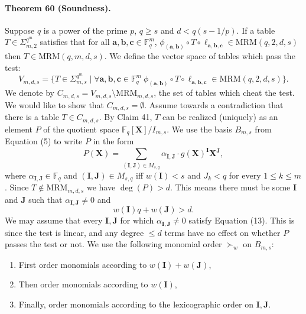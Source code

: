 \paragraph{Theorem 60 (Soundness).} Suppose $q$ is a power of the prime $p$, $q\geq s$ and $d<q(s-1/p)$. If a table $T\in\Sigma_{m,2}^{q^m}$ satisfies that for all $\boldsymbol a,\boldsymbol b,\boldsymbol c\in\mathbb F_q^m$, $\phi_{(\boldsymbol a,\boldsymbol b)}\circ T\circ\ell_{\boldsymbol a,\boldsymbol b,\boldsymbol c}\in\mathrm{MRM}(q,2,d,s)$ then $T\in\mathrm{MRM}(q,m,d,s)$.
We define the vector space of tables which pass the test:
\[V_{m,d,s}=\{T\in\Sigma_{m,s}^{q^m}\mid\forall\boldsymbol a,\boldsymbol b,\boldsymbol c\in\mathbb F_q^m\ \phi_{(\boldsymbol a,\boldsymbol b)}\circ T\circ\ell_{\boldsymbol a,\boldsymbol b,\boldsymbol c}\in\mathrm{MRM}(q,2,d,s)\}.\tag{12}\]
We denote by $C_{m,d,s}=V_{m,d,s}\setminus\mathrm{MRM}_{m,d,s}$, the set of tables which cheat the test. We would like to show that $C_{m,d,s}=\emptyset$. Assume towards a contradiction that there is a table $T\in C_{m,d,s}$. By Claim 41, $T$ can be realized (uniquely) as an element $P$ of the quotient space $\mathbb F_q[\boldsymbol X]/I_{m,s}$. We use the basis $B_{m,s}$ from Equation (5) to write $P$ in the form
\[P(\boldsymbol X)=\sum_{(\boldsymbol I,\boldsymbol J)\in M_{s,q}}\alpha_{\boldsymbol I,\boldsymbol J}\cdot g(\boldsymbol X)^{\boldsymbol I}\boldsymbol X^{\boldsymbol J},\]
where $\alpha_{\boldsymbol I,\boldsymbol J}\in\mathbb F_q$ and $(\boldsymbol I,\boldsymbol J)\in M_{s,q}$ iff $w(\boldsymbol I)<s$ and $J_k<q$ for every $1\leq k\leq m$. Since $T\notin\mathrm{MRM}_{m,d,s}$ we have $\deg(P)>d$. This means there must be some $\boldsymbol I$ and $\boldsymbol J$ such that $\alpha_{\boldsymbol I,\boldsymbol J}\neq0$ and
\[w(\boldsymbol I)q+w(\boldsymbol J)>d.\tag{13}\]
We may assume that every $\boldsymbol I,\boldsymbol J$ for which $\alpha_{\boldsymbol I,\boldsymbol J}\neq0$ satisfy Equation (13). This is since the test is linear, and any degree $\leq d$ terms have no effect on whether $P$ passes the test or not.
We use the following monomial order $\succ_w$ on $B_{m,s}$:
\begin{enumerate}
\item First order monomials according to $w(\boldsymbol I)+w(\boldsymbol J)$,
\item Then order monomials according to $w(\boldsymbol I)$,
\item Finally, order monomials according to the lexicographic order on $\boldsymbol I,\boldsymbol J$.
\end{enumerate}
